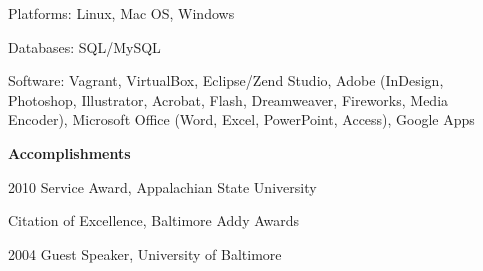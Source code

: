 \documentclass[letterpaper,10pt,final]{memoir}
\newcommand{\Sep}{\vspace{1.5em}}
\newcommand{\SmallSep}{\vspace{0.5em}}
\newcommand{\CVSection}[1]
	{\Large\textbf{#1}\par
	\SmallSep\normalsize\normalfont}
\begin{document}
Platforms: Linux, Mac OS, Windows
\SmallSep

Databases: SQL/MySQL
\SmallSep

Software: Vagrant, VirtualBox, Eclipse/Zend Studio, Adobe (InDesign, Photoshop, Illustrator, Acrobat, Flash, Dreamweaver, Fireworks, Media Encoder), Microsoft Office (Word, Excel, PowerPoint, Access), Google Apps
\Sep 

\CVSection{Accomplishments}
\begin{compactitem}[\color{BrickRed}$\circ$]
	\item 2010 Service Award, Appalachian State University
	\item Citation of Excellence, Baltimore Addy Awards
	\item 2004 Guest Speaker, University of Baltimore
\end{compactitem}

\end{document}
